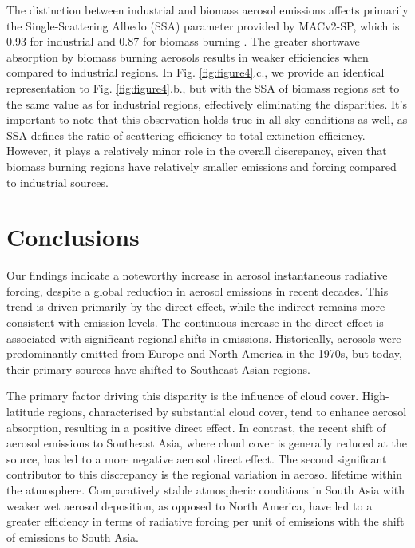 \documentclass[draft]{agujournal2019}
\begin{document}
            The distinction between industrial and biomass aerosol emissions affects primarily the Single-Scattering Albedo (SSA) parameter provided by MACv2-SP, which is 0.93 for industrial and 0.87 for biomass burning \cite{Stevens_2017}. The greater shortwave absorption by biomass burning aerosols results in weaker efficiencies when compared to industrial regions. In Fig. \ref{fig:figure4}.c., we provide an identical representation to Fig. \ref{fig:figure4}.b., but with the SSA of biomass regions set to the same value as for industrial regions, effectively eliminating the disparities.
            It's important to note that this observation holds true in all-sky conditions as well, as SSA defines the ratio of scattering efficiency to total extinction efficiency. However, it plays a relatively minor role in the overall discrepancy, given that biomass burning regions have relatively smaller emissions and forcing compared to industrial sources.

\section{Conclusions}
      Our findings indicate a noteworthy increase in aerosol instantaneous radiative forcing, despite a global reduction in aerosol emissions in recent decades. This trend is driven primarily by the direct effect, while the indirect remains more consistent with emission levels. The continuous increase in the direct effect is associated with significant regional shifts in emissions. Historically, aerosols were predominantly emitted from Europe and North America in the 1970s, but today, their primary sources have shifted to Southeast Asian regions. 
      
      The primary factor driving this disparity is the influence of cloud cover. High-latitude regions, characterised by substantial cloud cover, tend to enhance aerosol absorption, resulting in a positive direct effect. In contrast, the recent shift of aerosol emissions to Southeast Asia, where cloud cover is generally reduced at the source, has led to a more negative aerosol direct effect.
      The second significant contributor to this discrepancy is the regional variation in aerosol lifetime within the atmosphere. Comparatively stable atmospheric conditions in South Asia with weaker wet aerosol deposition, as opposed to North America, have led to a greater efficiency in terms of radiative forcing per unit of emissions with the shift of emissions to South Asia. 
\end{document}
